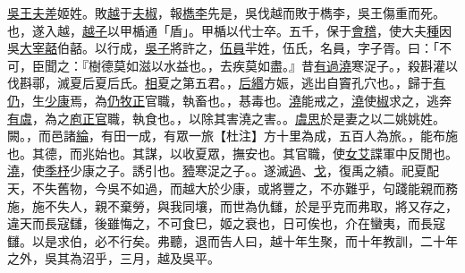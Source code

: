 \documentclass{article}
\newcommand{\tsu}{\small\kaishu\color{brown}}
\newcommand{\ta}{\small\kaishu\color{applegreen}}
\begin{document}
	
\uline{吳王}\quad\uline{夫差}{\tsu 姬姓。}敗\uline{越}于\uline{夫椒}，報\uline{檇李}{\tsu 先是，吳伐越而敗于檇李，吳王傷重而死。}也，遂入越，\uline{越子}以甲楯{\tsu 通「盾」。甲楯以代士卒。}五千，保于\uline{會稽}，使大夫\uline{種}因吳\uline{大宰}\uline{嚭}{\tsu 伯嚭。}以行成，\uline{吳子}將許之，\uline{伍員}{\tsu 羋姓，伍氏，名員，字子胥。}曰：「不可，臣聞之：『樹德莫如滋{\tsu 以水益也。}，去疾莫如盡。』昔\uline{有過}\quad\uline{澆}{\tsu 寒浞子。}，殺斟灌以伐斟鄩，滅夏后{\tsu 夏后氏。}\uline{相}{\tsu 夏之第五君。}，\uline{后緡}方娠，逃出自竇{\tsu 孔穴也。}，歸于\uline{有仍}，生\uline{少康}焉，為\uline{仍}\quad\uline{牧正}{\tsu 官職，執畜也。}，惎{\tsu 毒也。}\uline{澆}能戒之，\uline{澆}使\uline{椒}求之，逃奔\uline{有虞}，為之\uline{庖正}{\uline 官職，執食也。}，以除其害{\tsu 澆之害。}。\uline{虞思}於是妻之以二姚{\tsu 姚姓。闕。}，而邑諸\uline{綸}，有田一成，有眾一旅{\ta 【杜注】方十里為成，五百人為旅。}，能布{\tsu 施也。}其德，而兆{\tsu 始也。}其謀，以收夏眾，撫{\tsu 安也。}其官職，使\uline{女艾}諜{\tsu 軍中反閒也。}\uline{澆}，使\uline{季杼}{\tsu 少康之子。}誘{\tsu 引也。}\uline{豷}{\tsu 寒浞之子。}。遂滅\uline{過}、\uline{戈}，復禹之績。祀夏配天，不失舊物，今吳不如過，而越大於少康，或將豐之，不亦難乎，句踐能親而務施，施不失人，親不棄勞，與我同壤，而世為仇讎，於是乎克而弗取，將又存之，違天而長寇讎，後雖悔之，不可食巳，姬之衰也，日可俟也，介在蠻夷，而長寇讎。以是求伯，必不行矣。弗聽，退而告人曰，越十年生聚，而十年教訓，二十年之外，吳其為沼乎，三月，越及吳平。
\end{document}
